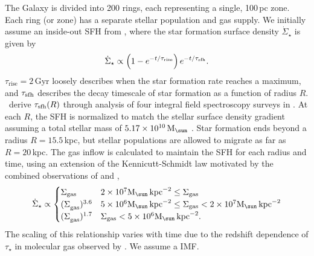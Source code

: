 \documentclass[fleqn,
usenatbib]{mnras}
\newcommand{\JJ}{\citetalias{james+21}}
\newcommand{\Mo}{%
    \ifmmode {\rm M}_{\sun}%
    \else {M$_{\sun}$}%
    \fi}
\begin{document}
The Galaxy is divided into 200 rings, each representing a single, 100\,pc zone. Each ring (or zone) has a separate stellar population and gas supply. We initially assume an inside-out SFH from \JJ, where the star formation surface density $\dot{\Sigma}_\star$ is given by 
\begin{equation}\label{eq:inside_out}
    \dot{\Sigma}_\star \propto \left(1-e^{-t/\tau_{\rm rise}}\right) e^{-t/\tau_{\rm sfh}}.
\end{equation}
$\tau_\text{rise}=2$\,Gyr loosely describes when the star formation rate reaches a maximum, and $\tau_{\rm sfh}$ describes the decay timescale of star formation as a function of radius $R$. \JJ\ derive $\tau_{\rm sfh}(R)$ through analysis of four integral field spectroscopy surveys in \cite{sanches20}. At each $R$, the SFH is normalized to match the stellar surface density gradient \citep{BHG16} assuming a total stellar mass of $5.17\times10^{10}\,\Mo$ \citep{LM15}. Star formation ends beyond a radius $R=15.5\,$kpc, but stellar populations are allowed to migrate as far as $R=20\,$kpc.  
The gas inflow is calculated to maintain the SFH for each radius and time, using an extension of the Kennicutt-Schmidt law \citep{kennicutt98} motivated by the combined observations of \citet{bigiel+10} and \citet{leroy+13}, 
\begin{equation}
\dot{\Sigma}_{\star} \propto 
\begin{cases}
    {\Sigma}_{\rm gas} & 2\times 10^7 \Mo\,{\rm kpc}^{-2} \leq \Sigma_{\rm gas} \\ 
    {(\Sigma}_{\rm gas})^{3.6} & 5\times 10^6 \Mo\,{\rm kpc}^{-2}\leq \Sigma_{\rm gas} < 2\times10^7 \Mo\,{\rm kpc}^{-2}\\ 
    {(\Sigma}_{\rm gas})^{1.7} & \Sigma_{\rm gas} < 5\times10^6 \Mo\,{\rm kpc}^{-2}.
\end{cases}
\end{equation} 
The scaling of this relationship varies with time due to the redshift dependence of $\tau_\star$ in molecular gas observed by \citet{tacconi18}. We assume a \citet{kroupa01} IMF.
\end{document}
